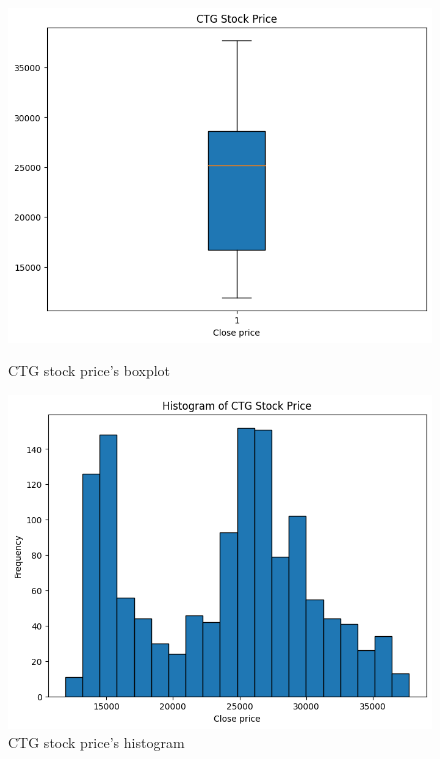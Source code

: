 \documentclass{ieeeojies}
\begin{document}
\begin{figure}[H]
    \centering
    \begin{minipage}{0.23\textwidth}
    \centering
    \includegraphics[width=1\textwidth]{bibliography/boxplot_ctg.png}
    \caption{CTG stock price's boxplot}
    \label{fig:1}
    \end{minipage}
    \hfill
    \begin{minipage}{0.23\textwidth}
    \centering
    \includegraphics[width=1\textwidth]{bibliography/histogram_ctg.png}
    \caption{CTG stock price's histogram}
    \label{fig:2}
    \end{minipage}
\end{figure}
\end{document}
